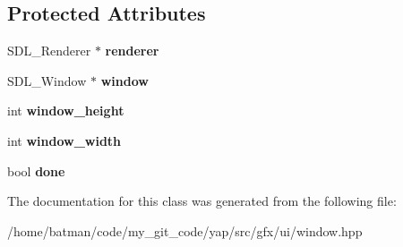 \subsection*{Protected Attributes}
\begin{DoxyCompactItemize}
\item 
\hypertarget{classWindow_a2b52309ef359b6392454a3bb57398b5d}{}S\+D\+L\+\_\+\+Renderer $\ast$ {\bfseries renderer}\label{classWindow_a2b52309ef359b6392454a3bb57398b5d}

\item 
\hypertarget{classWindow_ae39a7755a5a6ab74bcbdbe3e2e206820}{}S\+D\+L\+\_\+\+Window $\ast$ {\bfseries window}\label{classWindow_ae39a7755a5a6ab74bcbdbe3e2e206820}

\item 
\hypertarget{classWindow_a9a521dcf64e0fc3c4d7f16388fcfca1f}{}int {\bfseries window\+\_\+height}\label{classWindow_a9a521dcf64e0fc3c4d7f16388fcfca1f}

\item 
\hypertarget{classWindow_ac81447b26708f67b69c07e76637d6ecd}{}int {\bfseries window\+\_\+width}\label{classWindow_ac81447b26708f67b69c07e76637d6ecd}

\item 
\hypertarget{classWindow_aa083beca8982ad4445e6047d6f6c7d7b}{}bool {\bfseries done}\label{classWindow_aa083beca8982ad4445e6047d6f6c7d7b}

\end{DoxyCompactItemize}


The documentation for this class was generated from the following file\+:\begin{DoxyCompactItemize}
\item 
/home/batman/code/my\+\_\+git\+\_\+code/yap/src/gfx/ui/window.\+hpp\end{DoxyCompactItemize}
